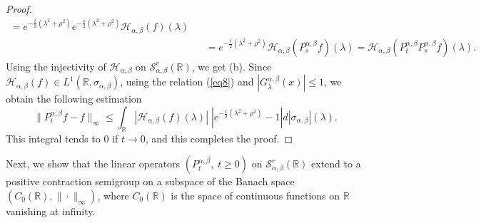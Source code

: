 \documentclass[a4paper,11pt, reqno]{amsart}
\theoremstyle{plain}
\theoremstyle{definition}
\theoremstyle{remark}
\def \R{{\mathbb R}}
\def\R{\mathbb R}
\def \S{{\mathcal S}}
\def \H{{\mathcal H}}
\begin{document}
\begin{proof}
\begin{eqnarray*}
= e^{-\frac{t}{2}\left( \lambda^2+\rho^2\right)} e^{-\frac{s}{2}\left( \lambda^2+\rho^2\right)}  \H_{\alpha, \beta} (f)(\lambda) \\
&& =  e^{-\frac{t}{2}\left( \lambda^2+\rho^2\right)} \H_{\alpha, \beta} \left(P^{\alpha, \beta}_s f \right)(\lambda)
= \H_{\alpha, \beta} \left( P^{\alpha, \beta}_t P^{\alpha, \beta}_s f \right)(\lambda).
\end{eqnarray*}
Using the injectivity of $\H_{\alpha, \beta}$ on $\S^r_{\alpha, \beta} (\mathbb{R})$, we get (b). Since $\H_{\alpha, \beta} (f) \in L^1(\R, \sigma_{\alpha, \beta})$, using the relation (\ref{eq8}) and $|G^{\alpha, \beta}_\lambda(x)| \leq 1$, we obtain the following estimation
\[ \| P^{\alpha, \beta}_t  f - f \|_{\infty} \leq \int_{\R}   |\H_{\alpha, \beta} (f)(\lambda)| \; \left| e^{-\frac{t}{2}\left( \lambda^2+\rho^2\right)} -1 \right| d|\sigma_{\alpha, \beta}|(\lambda). \]
This integral tends to $0$ if $t \rightarrow 0$, and this completes the proof.
\end{proof} 

Next, we show that the linear operators $\left(P^{\alpha, \beta}_t, \;t \geq 0\right)$ on $\S^r_{\alpha, \beta} (\mathbb{R})$ extend to a positive contraction semigroup on a subspace of the Banach space $\left(C_0(\mathbb{R}), \|\cdot \|_{\infty}\right)$, where $C_0(\mathbb{R})$ is the space of continuous functions on $\R$ vanishing at infinity.
\end{document}
